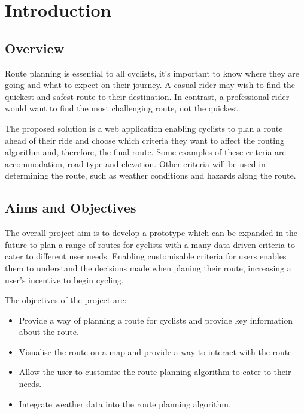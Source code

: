 \chapter{Introduction}
\label{chap:intro}

\section{Overview}
\label{intro:overview}

Route planning is essential to all cyclists, it's important to know where they are going and what to expect on their journey. A casual rider may wish to find the quickest and safest route to their destination. In contrast, a professional rider would want to find the most challenging route, not the quickest.

The proposed solution is a web application enabling cyclists to plan a route ahead of their ride and choose which criteria they want to affect the routing algorithm and, therefore, the final route. Some examples of these criteria are accommodation, road type and elevation. Other criteria will be used in determining the route, such as weather conditions and hazards along the route.

\section{Aims and Objectives}
\label{intro:aimsandobjectives}

The overall project aim is to develop a prototype which can be expanded in the future to plan a range of routes for cyclists with a many data-driven criteria to cater to different user needs. Enabling customisable criteria for users enables them to understand the decisions made when planing their route, increasing a user's incentive to begin cycling.

The objectives of the project are:
\begin{itemize}
    \item Provide a way of planning a route for cyclists and provide key information about the route.
    \item Visualise the route on a map and provide a way to interact with the route.
    \item Allow the user to customise the route planning algorithm to cater to their needs.
    \item Integrate weather data into the route planning algorithm.
\end{itemize}

